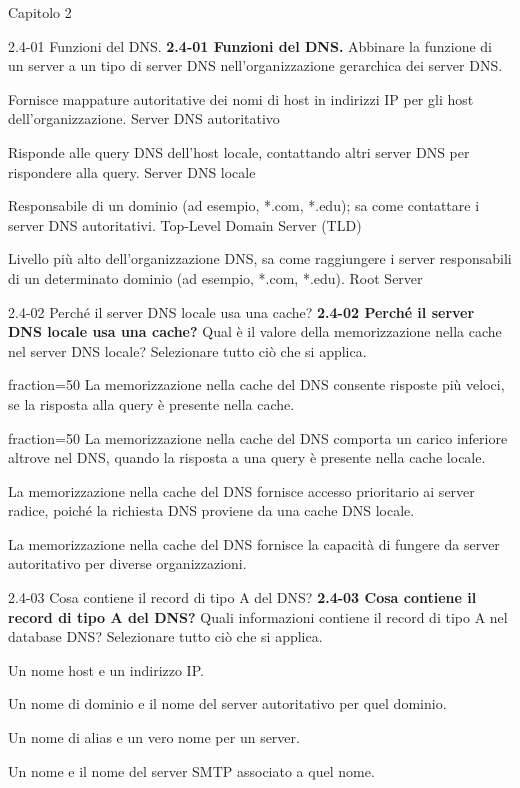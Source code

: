 \documentclass[a4paper]{article}
\begin{document}
\begin{quiz}{Capitolo 2}
\begin{matching}[points=1,shuffle]{2.4-01 Funzioni del DNS.}
\textbf{2.4-01 Funzioni del DNS.} 
Abbinare la funzione di un server a un tipo di server DNS nell'organizzazione gerarchica dei server DNS.
\item Fornisce mappature autoritative dei nomi di host in indirizzi IP per gli host dell'organizzazione. \answer Server DNS autoritativo
\item Risponde alle query DNS dell'host locale, contattando altri server DNS per rispondere alla query. \answer Server DNS locale
\item Responsabile di un dominio (ad esempio, *.com, *.edu); sa come contattare i server DNS autoritativi. \answer Top-Level Domain Server (TLD)
\item Livello più alto dell'organizzazione DNS, sa come raggiungere i server responsabili di un determinato dominio (ad esempio, *.com, *.edu). \answer Root Server
\end{matching}
    
\begin{multi}[points=1,shuffle,multiple]{2.4-02 Perché il server DNS locale usa una cache?}
\textbf{2.4-02 Perché il server DNS locale usa una cache?} 
Qual è il valore della memorizzazione nella cache nel server DNS locale? Selezionare tutto ciò che si applica.

\item[fraction=50] La memorizzazione nella cache del DNS consente risposte più veloci, se la risposta alla query è presente nella cache.
\item[fraction=50] La memorizzazione nella cache del DNS comporta un carico inferiore altrove nel DNS, quando la risposta a una query è presente nella cache locale.
\item La memorizzazione nella cache del DNS fornisce accesso prioritario ai server radice, poiché la richiesta DNS proviene da una cache DNS locale.
\item La memorizzazione nella cache del DNS fornisce la capacità di fungere da server autoritativo per diverse organizzazioni.
\end{multi}

\begin{multi}[points=1,shuffle,multiple]{2.4-03 Cosa contiene il record di tipo A del DNS?}
\textbf{2.4-03 Cosa contiene il record di tipo A del DNS?} 
Quali informazioni contiene il record di tipo A nel database DNS? Selezionare tutto ciò che si applica.
\item* Un nome host e un indirizzo IP.
\item Un nome di dominio e il nome del server autoritativo per quel dominio.
\item Un nome di alias e un vero nome per un server.
\item Un nome e il nome del server SMTP associato a quel nome.
\end{multi}



\end{quiz}
\end{document}
